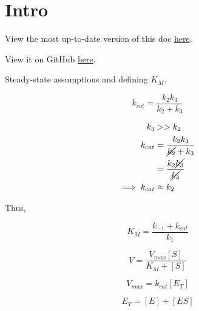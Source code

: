 \documentclass{article}
\title{\vspace{-2cm}}
\author{MedicinalYoyos}
\begin{document}
\maketitle

\section*{Intro}

View the most up-to-date version of this doc \href{https://www.overleaf.com/read/rgykqvzvfnvv}{here}.

View it on GitHub \href{https://github.com/Yoyomanzoor/EnzymeKinetics/main.pdf}{here}.

Steady-state assumptions and defining $K_M$.

\begin{center}
\end{center}

\begin{equation}
    k_{cat} = \frac{k_2k_3}{k_2 + k_3}
\end{equation}

\begin{align*}
    k_3 &>> k_2 \\
    k_{cat} &= \frac{k_2k_3}{\cancel{k_2} + k_3} \\
    &= \frac{k_2\cancel{k_3}}{\cancel{k_3}} \nonumber \\
    \implies k_{cat} &\approx k_2
\end{align*}

Thus,

\begin{center}
\end{center}

\begin{equation}
    K_M = \frac{k_{-1} + k_{cat}}{k_1}
\end{equation}

\begin{equation}
    V = \frac{V_{max}[S]}{K_M + [S]}
\end{equation}

\begin{equation}
    V_{max} = k_{cat} [E_T]
\end{equation}

\begin{equation}
    E_T = [E] + [ES]
\end{equation}
\end{document}
